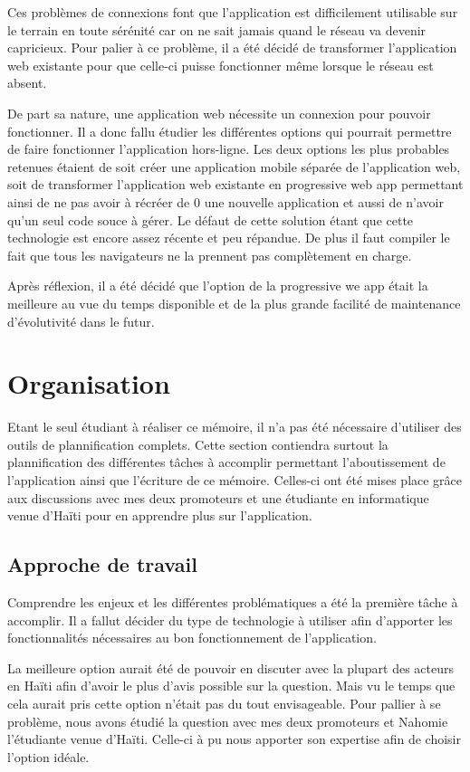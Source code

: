 \documentclass{EPL-master-thesis-covers-FR}
\begin{document}
		Ces problèmes de connexions font que l'application est difficilement utilisable sur le terrain en toute sérénité car on ne sait jamais quand le réseau va devenir capricieux. Pour palier à ce problème, il a été décidé de transformer l'application web existante pour que celle-ci puisse fonctionner même lorsque le réseau est absent.
				
				De part sa nature, une application web nécessite un connexion pour pouvoir fonctionner. Il a donc fallu étudier les différentes options qui pourrait permettre de faire fonctionner l'application hors-ligne. Les deux options les plus probables retenues étaient de soit créer une application mobile séparée de l'application web, soit de transformer l'application web existante en progressive web app permettant ainsi de ne pas avoir à récréer de 0 une nouvelle application et aussi de n'avoir qu'un seul code souce à gérer. Le défaut de cette solution étant que cette technologie est encore assez récente et peu répandue. De plus il faut compiler le fait que tous les navigateurs ne la prennent pas complètement en charge. 
				
				Après réflexion, il a été décidé que l'option de la progressive we app était la meilleure au vue du temps disponible et de la plus grande facilité de maintenance d'évolutivité dans le futur.

	\chapter{Organisation}
		

		Etant le seul étudiant à réaliser ce mémoire, il n'a pas été nécessaire d'utiliser des outils de plannification complets. Cette section contiendra surtout la plannification des différentes tâches à accomplir permettant l'aboutissement de l'application ainsi que l'écriture de ce mémoire. Celles-ci ont été mises place grâce aux discussions avec mes deux promoteurs et une étudiante en informatique venue d'Haïti pour en apprendre plus sur l'application. 

		\section{Approche de travail}
			Comprendre les enjeux et les différentes problématiques a été la première tâche à accomplir. Il a fallut décider du type de technologie à utiliser afin d'apporter les fonctionnalités nécessaires au bon fonctionnement de l'application. 
			
			La meilleure option aurait été de pouvoir en discuter avec la plupart des acteurs en Haïti afin d'avoir le plus d'avis possible sur la question. Mais vu le temps que cela aurait pris cette option n'était pas du tout envisageable. Pour pallier à se problème, nous avons étudié la question avec mes deux promoteurs et Nahomie l'étudiante venue d'Haïti. Celle-ci à pu nous apporter son expertise afin de choisir l'option idéale.
			
\end{document}
